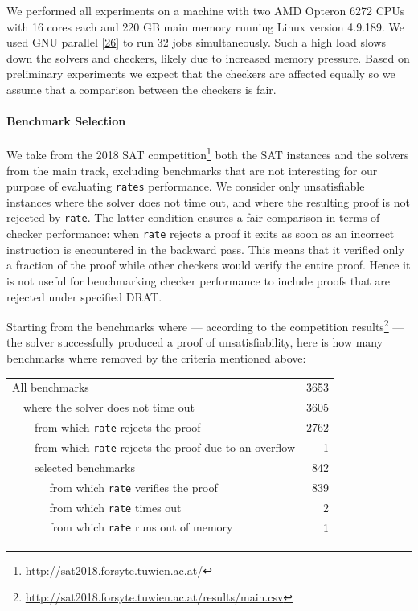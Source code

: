 \documentclass[
]{report}
\begin{document}
We performed all experiments on a machine with two AMD Opteron 6272 CPUs
with 16 cores each and 220 GB main memory running Linux version 4.9.189.
We used GNU parallel {[}\protect\hyperlink{ref-Tange2018}{26}{]} to run
32 jobs simultaneously. Such a high load slows down the solvers and
checkers, likely due to increased memory pressure. Based on preliminary
experiments we expect that the checkers are affected equally so we
assume that a comparison between the checkers is fair.

\paragraph{Benchmark Selection}

We take from the 2018 SAT competition\footnote{\url{http://sat2018.forsyte.tuwien.ac.at/}}
both the SAT instances and the solvers from the main track, excluding
benchmarks that are not interesting for our purpose of evaluating
\texttt{rate\textquotesingle{}s} performance. We consider only
unsatisfiable instances where the solver does not time out, and where
the resulting proof is not rejected by \texttt{rate}. The latter
condition ensures a fair comparison in terms of checker performance:
when \texttt{rate} rejects a proof it exits as soon as an incorrect
instruction is encountered in the backward pass. This means that it
verified only a fraction of the proof while other checkers would verify
the entire proof. Hence it is not useful for benchmarking checker
performance to include proofs that are rejected under specified DRAT.

Starting from the benchmarks where --- according to the competition
results\footnote{\url{http://sat2018.forsyte.tuwien.ac.at/results/main.csv}}
--- the solver successfully produced a proof of unsatisfiability, here
is how many benchmarks where removed by the criteria mentioned above:

\begin{tabular}{p{}p{}p{}lr}
\toprule
\multicolumn{4}{l}{All benchmarks}                                            & 3653 \\
&\multicolumn{3}{l}{where the solver does not time out}                       & 3605 \\
&&\multicolumn{2}{l}{from which \texttt{rate} rejects the proof}              & 2762 \\
&&\multicolumn{2}{l}{from which \texttt{rate} rejects the proof due to an overflow} & 1    \\
&&\multicolumn{2}{l}{selected benchmarks}                                     & 842  \\
\midrule
&&&\multicolumn{1}{l}{from which \texttt{rate} verifies the proof}                       & 839  \\
&&&\multicolumn{1}{l}{from which \texttt{rate} times out}                                & 2    \\
&&&\multicolumn{1}{l}{from which \texttt{rate} runs out of memory}                       & 1    \\
\bottomrule
\end{tabular}
\end{document}
